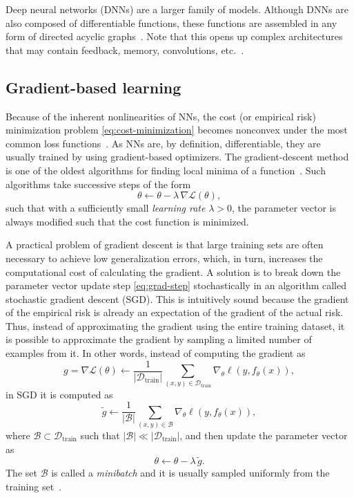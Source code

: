 
Deep neural networks (DNNs) are a larger family of models.
Although DNNs are also composed of differentiable functions, these functions are assembled in any form of directed acyclic graphs~\cite{murphyMachineLearningProbabilistic2013}.
Note that this opens up complex architectures that may contain feedback, memory, convolutions, etc.~\cite {Goodfellow-et-al-2016}.

\subsection{Gradient-based learning}\label{sec:gradient-based-learning}

Because of the inherent nonlinearities of NNs, the cost (or empirical risk) minimization problem \eqref{eq:cost-minimization} becomes nonconvex under the most common loss functions~\cite{Goodfellow-et-al-2016}.
As NNs are, by definition, differentiable, they are usually trained by using gradient-based optimizers.
The gradient-descent method is one of the oldest algorithms for finding local minima of a function~\cite{cauchy1847}.
Such algorithms take successive steps of the form
\begin{equation}\label{eq:grad-step}
    \theta \gets \theta - \lambda\, \nabla \mathcal{L}(\theta)
,\end{equation}
such that with a sufficiently small \emph{learning rate} $\lambda>0$, the parameter vector is always modified such that the cost function is minimized.

A practical problem of gradient descent is that large training sets are often necessary to achieve low generalization errors, which, in turn, increases the computational cost of calculating the gradient.
A solution is to break down the parameter vector update step \eqref{eq:grad-step} stochastically in an algorithm called stochastic gradient descent (SGD).
This is intuitively sound because the gradient of the empirical risk is already an expectation of the gradient of the actual risk. 
Thus, instead of approximating the gradient using the entire training dataset, it is possible to approximate the gradient by sampling a limited number of examples from it.
In other words, instead of computing the gradient as \[
    g = \nabla \mathcal{L}(\theta) \gets \frac{1}{|\mathcal{D}_\textrm{train}|}\sum_{(x,y)\in \mathcal{D}_\textrm{train}} \nabla_\theta \ell(y,f_\theta(x))
,\] in SGD it is computed as \[
\widetilde{g} \gets \frac{1}{|\mathcal{B}|}\sum_{(x,y)\in \mathcal{B}} \nabla_\theta \ell(y,f_\theta(x)) 
,\] where $\mathcal{B}\subset \mathcal{D}_\textrm{train}$ such that $|\mathcal{B}|\ll |\mathcal{D}_\textrm{train}|$, and then update the parameter vector as \[
\theta \gets \theta -\lambda\, \widetilde{g}
.\] 
The set $\mathcal{B}$ is called a \emph{minibatch} and it is usually sampled uniformly from the training set~\cite{Goodfellow-et-al-2016}.


